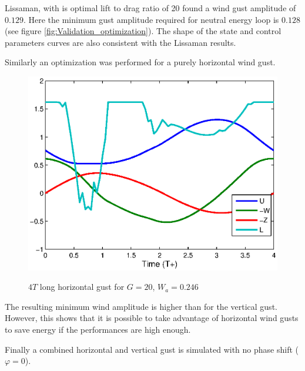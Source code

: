 \FloatBarrier

Lissaman, with is optimal lift to drag ratio of 20 found a wind gust amplitude of $0.129$. 
Here the minimum gust amplitude required for neutral energy loop is $0.128$ (see figure \ref{fig:Validation_optimization}).
The shape of the state and control parameters curves are also consistent with the Lissaman results.

\par Similarly an optimization was performed for a purely horizontal wind gust.

\begin{figure}[h]
  \begin{center}
    \scalebox{1.0}
    {\includegraphics{./Figures/Windtype=2_Tg=4_Wg=0p246_quad_G=20.eps}}
  \end{center}
  \caption{$4T$ long horizontal gust for $G=20$, $W_a=0.246$}
  \label{fig:Horizontal_optimization}
\end{figure}

The resulting minimum wind amplitude is higher than for the vertical gust. 
However, this shows that it is possible to take advantage of horizontal wind gusts to save energy if the performances are high enough.

\par Finally a combined horizontal and vertical gust is simulated with no phase shift ($\varphi=0$).

